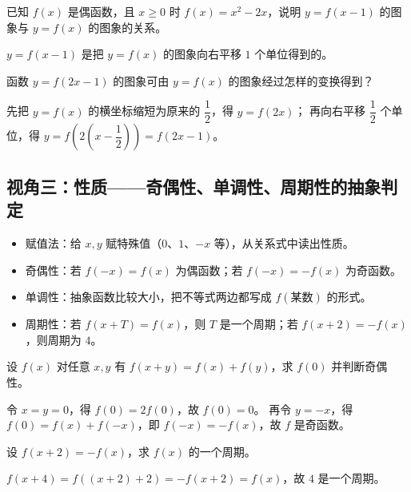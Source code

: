 \begin{explore}
\begin{example}
已知 $f(x)$ 是偶函数，且 $x\geq0$ 时 $f(x)=x^2-2x$，说明 $y=f(x-1)$ 的图象与 $y=f(x)$ 的图象的关系。
\end{example}
\begin{solution}
$y=f(x-1)$ 是把 $y=f(x)$ 的图象向右平移 $1$ 个单位得到的。
\end{solution}

\begin{problem}
函数 $y=f(2x-1)$ 的图象可由 $y=f(x)$ 的图象经过怎样的变换得到？
\end{problem}
\begin{solution}
先把 $y=f(x)$ 的横坐标缩短为原来的 $\dfrac12$，得 $y=f(2x)$；
再向右平移 $\dfrac12$ 个单位，得 $y=f\left(2\left(x-\dfrac12\right)\right)=f(2x-1)$。
\end{solution}

\subsection{视角三：性质——奇偶性、单调性、周期性的抽象判定}

  \begin{itemize}
  \item 赋值法：给 $x,y$ 赋特殊值（$0$、$1$、$-x$ 等），从关系式中读出性质。
  \item 奇偶性：若 $f(-x)=f(x)$ 为偶函数；若 $f(-x)=-f(x)$ 为奇函数。
  \item 单调性：抽象函数比较大小，把不等式两边都写成 $f(\text{某数})$ 的形式。
  \item 周期性：若 $f(x+T)=f(x)$，则 $T$ 是一个周期；若 $f(x+2)=-f(x)$，则周期为 $4$。
\end{itemize}

\begin{example}
设 $f(x)$ 对任意 $x,y$ 有 $f(x+y)=f(x)+f(y)$，求 $f(0)$ 并判断奇偶性。
\end{example}
\begin{solution}
令 $x=y=0$，得 $f(0)=2f(0)$，故 $f(0)=0$。
再令 $y=-x$，得 $f(0)=f(x)+f(-x)$，即 $f(-x)=-f(x)$，故 $f$ 是奇函数。
\end{solution}

\begin{problem}
设 $f(x+2)=-f(x)$，求 $f(x)$ 的一个周期。
\end{problem}
\begin{solution}
$f(x+4)=f((x+2)+2)=-f(x+2)=f(x)$，故 $4$ 是一个周期。
\end{solution}


\end{explore}
